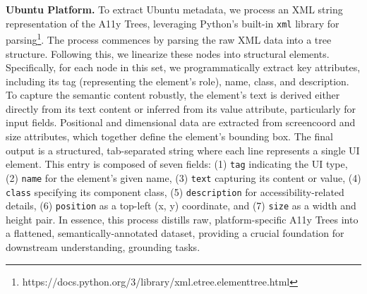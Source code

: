 \textbf{Ubuntu Platform.} To extract Ubuntu metadata, we process an XML string representation of the A11y Trees, leveraging Python's built-in \texttt{xml} library for parsing\footnote{https://docs.python.org/3/library/xml.etree.elementtree.html}. The process commences by parsing the raw XML data into a tree structure. Following this, we linearize these nodes into structural elements. Specifically, for each node in this set, we programmatically extract key attributes, including its tag (representing the element's role), name, class, and description. To capture the semantic content robustly, the element's text is derived either directly from its text content or inferred from its value attribute, particularly for input fields. Positional and dimensional data are extracted from screencoord and size attributes, which together define the element's bounding box. The final output is a structured, tab-separated string where each line represents a single UI element. This entry is composed of seven fields: (1) \texttt{tag} indicating the UI type, (2) \texttt{name} for the element's given name, (3) \texttt{text} capturing its content or value, (4) \texttt{class} specifying its component class, (5) \texttt{description} for accessibility-related details, (6) \texttt{position} as a top-left (x, y) coordinate, and (7) \texttt{size} as a width and height pair. In essence, this process distills raw, platform-specific A11y Trees into a flattened, semantically-annotated dataset, providing a crucial foundation for downstream understanding, grounding tasks.

